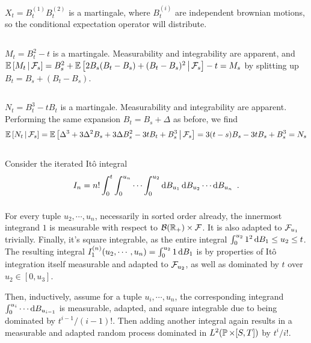 \documentclass{article}
\begin{document}
\subsubsection{}
\(X_t=B_t^{(1)}B_t^{(2)}\) is a martingale, where \(B_t^{(i)}\) are independent brownian motions, so the conditional expectation operator will distribute.

\subsection{}

\(M_t=B_t^2-t\) is a martingale. Measurability and integrability are apparent, and \(\CE{M_t}{\mcF_s}=B_s^2+\CE{2B_s(B_t-B_s)+(B_t-B_s)^2}{\mcF_s}-t=M_s\) by splitting up \(B_t=B_s+(B_t-B_s)\).

\subsection{}

\(N_t=B_t^3-tB_t\) is a martingale. Measurability and integrability are apparent. Performing the same expansion \(B_t=B_s+\Delta\) as before, we find
\[
  \CE{N_t}{\mcF_s}=
  \CE{\Delta^3 + 3\Delta^2 B_s+3\Delta B_s^2-3tB_t+B_s^3}{\mcF_s}=
  3(t-s) B_s-3tB_s+B_s^3=N_s
\]\label{pt3}
\subsection{}
Consider the iterated It\^{o} integral
\[
  I_n=n!\int_0^{t}\int_0^{u_n}\cdots\int_0^{u_2}\d{B_{u_1}}\d{B_{u_2}}\cdots\d{B_{u_n}}\,\,.
\]

\subsubsection{}

For every tuple \(u_2,\cdots, u_n\), necessarily in sorted order already, the innermost integrand \(1\) is measurable with respect to \(\mcB(\R_+)\times \mcF\). It is also adapted to \(\mcF_{u_1}\) trivially. Finally, it's square integrable, as the entire integral \(\int_0^{u_2}1^2\d{B_1}\le u_2\le t\). The resulting integral \(I^{(n)}_1(u_2,\cdots, u_n)=\int_0^{u_2}1\d{B_1}\) is by properties of It\^{o} integration itself measurable and adapted to \(\mcF_{u_2}\), as well as dominated by \(t\) over \(u_2\in[0,u_3]\).

Then, inductively, assume for a tuple \(u_i,\cdots, u_n\), the corresponding integrand \(\int_0^{u_{i}}\cdots\d{B_{u_{i-1}}}\) is measurable, adapted, and square integrable due to being dominated by \(t^{i-1}/(i-1)!\). Then adding another integral again results in a measurable and adapted random process dominated in \(L^2(\P \times [S,T])\) by \(t^i/i!\).
\end{document}
